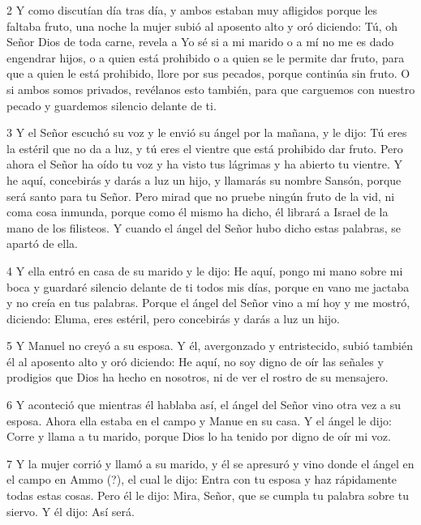 \par 2 Y como discutían día tras día, y ambos estaban muy afligidos porque les faltaba fruto, una noche la mujer subió al aposento alto y oró diciendo: Tú, oh Señor Dios de toda carne, revela a Yo sé si a mi marido o a mí no me es dado engendrar hijos, o a quien está prohibido o a quien se le permite dar fruto, para que a quien le está prohibido, llore por sus pecados, porque continúa sin fruto. O si ambos somos privados, revélanos esto también, para que carguemos con nuestro pecado y guardemos silencio delante de ti.

\par 3 Y el Señor escuchó su voz y le envió su ángel por la mañana, y le dijo: Tú eres la estéril que no da a luz, y tú eres el vientre que está prohibido dar fruto. Pero ahora el Señor ha oído tu voz y ha visto tus lágrimas y ha abierto tu vientre. Y he aquí, concebirás y darás a luz un hijo, y llamarás su nombre Sansón, porque será santo para tu Señor. Pero mirad que no pruebe ningún fruto de la vid, ni coma cosa inmunda, porque como él mismo ha dicho, él librará a Israel de la mano de los filisteos. Y cuando el ángel del Señor hubo dicho estas palabras, se apartó de ella.

\par 4 Y ella entró en casa de su marido y le dijo: He aquí, pongo mi mano sobre mi boca y guardaré silencio delante de ti todos mis días, porque en vano me jactaba y no creía en tus palabras. Porque el ángel del Señor vino a mí hoy y me mostró, diciendo: Eluma, eres estéril, pero concebirás y darás a luz un hijo.

\par 5 Y Manuel no creyó a su esposa. Y él, avergonzado y entristecido, subió también él al aposento alto y oró diciendo: He aquí, no soy digno de oír las señales y prodigios que Dios ha hecho en nosotros, ni de ver el rostro de su mensajero.

\par 6 Y aconteció que mientras él hablaba así, el ángel del Señor vino otra vez a su esposa. Ahora ella estaba en el campo y Manue en su casa. Y el ángel le dijo: Corre y llama a tu marido, porque Dios lo ha tenido por digno de oír mi voz.

\par 7 Y la mujer corrió y llamó a su marido, y él se apresuró y vino donde el ángel en el campo en Ammo (?), el cual le dijo: Entra con tu esposa y haz rápidamente todas estas cosas. Pero él le dijo: Mira, Señor, que se cumpla tu palabra sobre tu siervo. Y él dijo: Así será.

